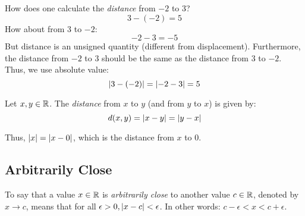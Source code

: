 \documentclass[letterpaper,12pt,fleqn]{article}
\newcommand{\e}{\epsilon}
\begin{document}
\bigskip

\begin{center}
\end{center}

How does one calculate the \emph{distance} from \(-2\) to \(3\)?
\[3-(-2)=5\]
How about from \(3\) to \(-2\):
\[-2-3=-5\]
But distance is an unsigned quantity (different from displacement).  Furthermore, the distance from \(-2\) to \(3\)
should be the same as the distance from \(3\) to \(-2\).  Thus, we use absolute value:
\[\lvert3-(-2)\rvert=\lvert-2-3\rvert=5\]

\begin{definition}[Distance]
  Let \(x,y\in\mathbb{R}\).  The \emph{distance} from \(x\) to \(y\) (and from \(y\) to \(x\)) is given by:
  \[d(x,y)=\lvert x-y\rvert=\lvert y-x\rvert\]
\end{definition}

Thus, \(\lvert x\rvert=\lvert x-0\rvert\), which is the distance from \(x\) to \(0\).

\subsection*{Arbitrarily Close}

\begin{definition}
  To say that a value \(x\in\mathbb{R}\) is \emph{arbitrarily close} to another value \(c\in\mathbb{R}\), denoted by \(x\to c\),
  means that for all \(\e>0,\abs{x-c}<\e\).  In other words: \(c-\e<x<c+\e\).
\end{definition}

\bigskip

\begin{center}
\end{center}
\end{document}
